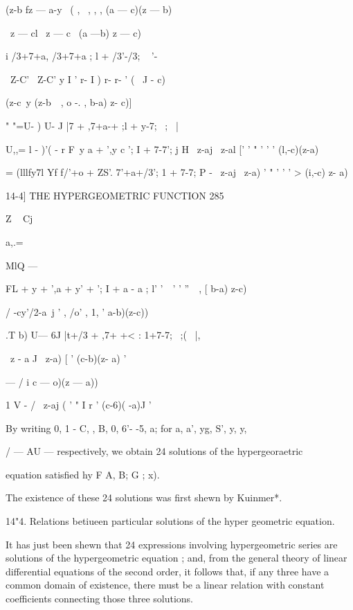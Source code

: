 (z-b fz — a-y \ ( , \ , , , (a — c)(z — b)

\ z — cl \ z — c \ (a —b) z — c)

i /3+7+a, /3+7+a ; l + /3'-/3; ~ '-\

\ Z-C' \ Z-C' y I ' r- I ) r- r- ' ( \ J - c)\

(z-c\ y (z-b\ \ , o -. , b-a) z- c)]

" "=U- ) U- J |7 + ,7+a-+ ;l + y-7; \ ; \ |

U,,= l - )'( - r F\ y a + ',y c '; I + 7-7'; j H \ z-aj \ z-al [' ' "
' ' ' (l,-c)(z-a)\

   = (lllfy7l Yf f/'+o + ZS'. 7'+a+/3'; 1 + 7-7; P - \ z-aj \ z-a) ' "
' ' ' > (i,-c) z- a)



14-4] THE HYPERGEOMETRIC FUNCTION 285



Z ~ Cj



a,.=



MlQ —



FL + y + ',a + y' + '; I + a - a ; l' '\ \ ' ' ''\ \ , [ b-a) z-c)

/ -cy'/2-a\ j ' , /o' , 1, ' a-b)(z-c))

.T b) U— 6J |t+/3 + ,7+ +< : 1+7-7; \ ;( \ |,

\ z - a J \ z-a) [ ' (c-b)(z- a) '

— / i c — o)(z — a))

1 V - / \ z-aj ( ' " I r ' (c-6)( -a)J '

By writing 0, 1 - C, , B, 0, 6'- -5, a; for a, a', yg, S', y, y,

/ — AU — respectively, we obtain 24 solutions of the hypergeoraetric

equation satisfied hy F A, B; G ; x).

The existence of these 24 solutions was first shewn by Kuinmer*.

14"4. Relations betiueen particular solutions of the hyper geometric
equation.

It has just been shewn that 24 expressions involving hypergeometric
series are solutions of the hypergeometric equation ; and, from the
general theory of linear differential equations of the second order,
it follows that, if any three have a common domain of existence, there
must be a linear relation with constant coefficients connecting those
three solutions.

